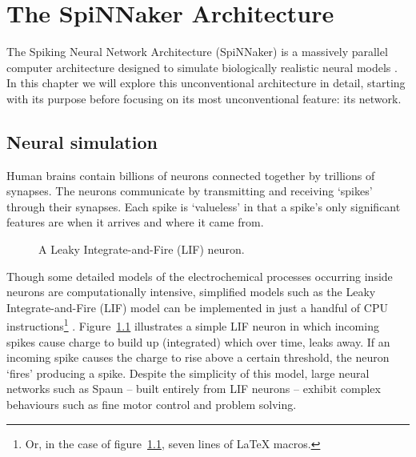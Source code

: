 \chapter{The SpiNNaker Architecture}
	
	\label{sec:background}
	
	The Spiking Neural Network Architecture (SpiNNaker) is a massively parallel
	computer architecture designed to simulate biologically realistic neural
	models \cite{furber07}. In this chapter we will explore this unconventional
	architecture in detail, starting with its purpose before focusing on its most
	unconventional feature: its network.
	
	
	\section{Neural simulation}
		
		Human brains contain billions of neurons connected together by trillions of
		synapses. The neurons communicate by transmitting and receiving `spikes'
		through their synapses. Each spike is `valueless' in that a spike's only
		significant features are when it arrives and where it came from.
		
		\begin{figure}
			\center
			
			\caption{A Leaky Integrate-and-Fire (LIF) neuron.}
			\label{fig:lif-neuron}
		\end{figure}
		
		Though some detailed models of the electrochemical processes occurring
		inside neurons are computationally intensive, simplified models such as the
		Leaky Integrate-and-Fire (LIF) model can be implemented in just a handful
		of CPU instructions\footnote{Or, in the case of
		figure~\ref{fig:lif-neuron}, seven lines of \LaTeX{} macros.}
		\cite{vainbrand11}. Figure~\ref{fig:lif-neuron} illustrates a simple LIF
		neuron in which incoming spikes cause charge to build up (integrated) which
		over time, leaks away. If an incoming spike causes the charge to rise above
		a certain threshold, the neuron `fires' producing a spike. Despite the
		simplicity of this model, large neural networks such as Spaun
		\cite{eliasmith12} -- built entirely from LIF neurons -- exhibit complex
		behaviours such as fine motor control and problem solving.
		
